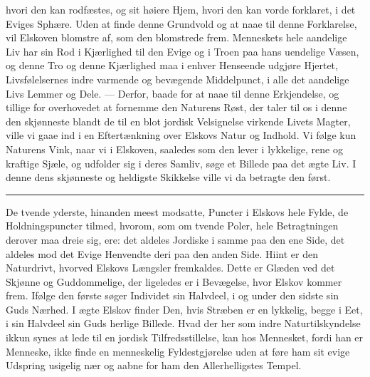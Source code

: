 \documentclass[12pt,a4paper]{book}
\newcommand{\apage}[1]{\marginnote{\footnotesize\textit{[#1]}}}
\begin{document}
hvori den kan rodfæstes, og sit høiere Hjem, hvori den kan vorde
forklaret, i det Eviges Sphære. Uden at finde denne Grundvold og at
naae til denne Forklarelse, vil Elskoven blomstre af, som den
blomstrede frem. Menneskets hele aandelige Liv har sin Rod i Kjærlighed
til den Evige og i Troen paa \apage{3} hans uendelige Væsen, og denne Tro og
denne Kjærlighed maa i enhver Henseende udgjøre Hjertet, Livsfølelsernes
indre varmende og bevægende Middelpunct, i alle det aandelige Livs
Lemmer og Dele. --- Derfor, baade for at naae til denne Erkjendelse, og
tillige for overhovedet at fornemme den Naturens Røst, der taler til os
i denne den skjønneste blandt de til en blot jordisk Velsignelse
virkende Livets Magter, ville vi gaae ind i en Eftertænkning over
Elskovs Natur og Indhold. Vi følge kun Naturens Vink, naar vi i
Elskoven, saaledes som den lever i lykkelige, rene og kraftige Sjæle,
og udfolder sig i deres Samliv, søge et Billede paa det ægte Liv. I
denne dens skjønneste og heldigste Skikkelse ville vi da betragte den
først.

\begin{center}\rule{0.2\linewidth}{0.4pt}\end{center}

De tvende yderste, hinanden meest modsatte, Puncter i Elskovs hele
Fylde, de Holdningspuncter tilmed, hvorom, som om tvende Poler, hele
Betragtningen derover maa dreie sig, ere: det aldeles Jordiske i samme
paa den ene Side, det aldeles mod det Evige Henvendte deri paa den
anden Side. Hiint er den Naturdrivt, hvorved Elskovs Længsler
fremkaldes. Dette er Glæden ved det Skjønne og Guddommelige, der
ligeledes er i Bevægelse, hvor Elskov kommer frem. Ifølge den første
søger Individet sin Halvdeel, i og under den sidste sin Guds Nærhed. I
ægte Elskov finder Den, hvis Stræben er en lykkelig, begge i Eet, i sin \apage{4}
Halvdeel sin Guds herlige Billede. Hvad der her som indre
Naturtilskyndelse ikkun synes at lede til en jordisk Tilfredsstillelse,
kan hos Mennesket, fordi han er Menneske, ikke finde en menneskelig
Fyldestgjørelse uden at føre ham sit evige Udspring usigelig nær og
aabne for ham den Allerhelligstes Tempel.
\end{document}
